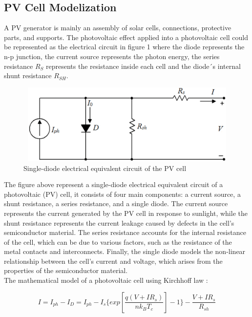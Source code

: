 \documentclass{report}
\begin{document}
\subsection{PV Cell Modelization}
A PV generator is mainly an assembly of solar cells, connections, protective parts, and supports. The photovoltaic effect applied into a photovoltaic cell could be represented as the electrical circuit in figure 1 where the diode represents the n-p junction, the current source represents the photon energy, the series resistance  $R_{S}$ represents the resistance inside each cell and the diode´s internal shunt resistance $R_{SH}$.\\
\begin{figure}[h!]
    \centering
    \includegraphics[width=12cm, height=4cm] {fivep.png}
    \caption{Single-diode electrical equivalent circuit of the PV  cell\\ \cite{mughalpaper}}
    \label{fig:my_label}
\end{figure}
\newpage
\hfill \break
The figure above represent a single-diode electrical equivalent circuit of a photovoltaic (PV) cell, it consists of four main components: a current source, a shunt resistance, a series resistance, and a single diode. The current source represents the current generated by the PV cell in response to sunlight, while the shunt resistance represents the current leakage caused by defects in the cell's semiconductor material. The series resistance accounts for the internal resistance of the cell, which can be due to various factors, such as the resistance of the metal contacts and interconnects. Finally, the single diode models the non-linear relationship between the cell's current and voltage, which arises from the properties of the semiconductor material.\\
\hfill \break
The mathematical model of a photovoltaic cell using Kirchhoff law :


\begin{equation}
I = I_{ph} - I_{D} = I_{ph} - I_{s} \{ exp
 \left[  \frac{q(V+IR_{s})}{nk_{B}T_{c}} \right] - 1 \} - \frac{V+IR_{s}}{R_{sh}}
\end{equation}
\end{document}
